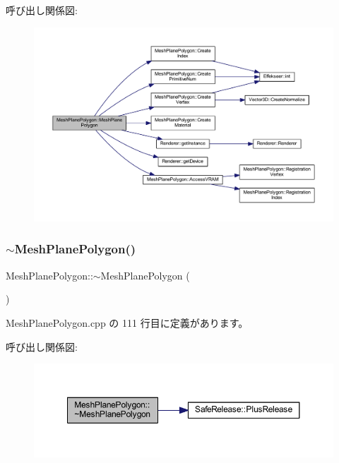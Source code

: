 呼び出し関係図\+:
\nopagebreak
\begin{figure}[H]
\begin{center}
\leavevmode
\includegraphics[width=350pt]{class_mesh_plane_polygon_a7db07104974799895b42997c71ba8d3e_cgraph}
\end{center}
\end{figure}
\mbox{\label{class_mesh_plane_polygon_a6c76a24c3f35cd9a77e6947c22fa4c3d}} 
\subsubsection{\texorpdfstring{$\sim$\+Mesh\+Plane\+Polygon()}{~MeshPlanePolygon()}}
{\footnotesize\ttfamily Mesh\+Plane\+Polygon\+::$\sim$\+Mesh\+Plane\+Polygon (\begin{DoxyParamCaption}{ }\end{DoxyParamCaption})\hspace{0.3cm}{\ttfamily [virtual]}}



 Mesh\+Plane\+Polygon.\+cpp の 111 行目に定義があります。

呼び出し関係図\+:\nopagebreak
\begin{figure}[H]
\begin{center}
\leavevmode
\includegraphics[width=350pt]{class_mesh_plane_polygon_a6c76a24c3f35cd9a77e6947c22fa4c3d_cgraph}
\end{center}
\end{figure}


